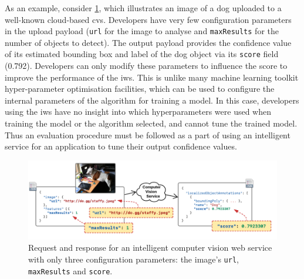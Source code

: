 As an example, consider \cref{fig:dog-example}, which illustrates an image of a dog uploaded to a well-known cloud-based \gls{cvs}. Developers have very few configuration parameters in the upload payload (\texttt{url} for the image to analyse and \texttt{maxResults} for the number of objects to detect). The  output payload provides the confidence value of its estimated bounding box and label of the dog object via its \texttt{score} field (0.792). Developers can only modify these parameters to influence the score to improve the performance of the \gls{iws}. This is unlike many machine learning toolkit hyper-parameter optimisation facilities, which can be used to configure the internal parameters of the algorithm for training a model. In this case, developers using the \gls{iws} have no insight into which hyperparameters were used when training the model or the algorithm selected, and cannot tune the trained model. Thus an evaluation procedure must be followed as a part of using an intelligent service for an application to tune their output confidence values. 

\begin{figure}[th]
    \includegraphics[width=\linewidth]{dog-example}
    \caption{Request and response for an intelligent computer vision web service with only three configuration parameters: the image's \texttt{url}, \texttt{maxResults} and \texttt{score}.}
    \label{fig:dog-example}
\end{figure}

